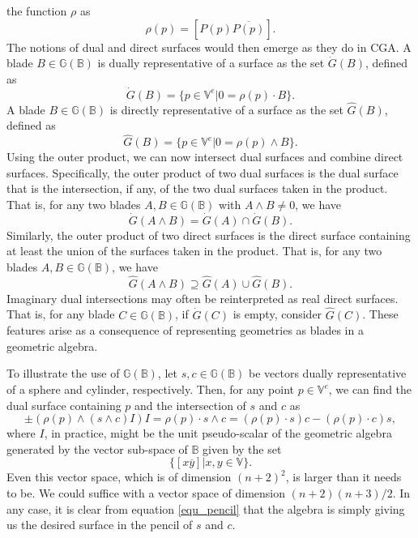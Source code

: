\documentclass{birkjour}
\theoremstyle{definition}
\theoremstyle{remark}
\numberwithin{equation}{section}
\newcommand{\G}{\mathbb{G}}
\newcommand{\V}{\mathbb{V}}
\newcommand{\B}{\mathbb{B}}
\newcommand{\Gi}{\dot{G}}
\newcommand{\Go}{\hat{G}}
\begin{document}
the function $\rho$ as
\begin{equation}\label{equ_def_of_rho}
\rho(p) = [P(p)\overline{P(p)}].
\end{equation}
The notions of dual and direct surfaces
would then emerge as they do in CGA.  A blade $B\in\G(\B)$ is dually representative
of a surface as the set $\Gi(B)$, defined as
\begin{equation}\label{equ_algebraic_set}
\Gi(B) = \{p\in\V^e|0=\rho(p)\cdot B\}.
\end{equation}
A blade $B\in\G(\B)$ is directly representative of a surface as the set $\Go(B)$,
defined as
\begin{equation}
\Go(B) = \{p\in\V^e|0=\rho(p)\wedge B\}.
\end{equation}
Using the outer product, we can now
intersect dual surfaces and combine direct surfaces.  Specifically, the outer product
of two dual surfaces is the dual surface that is the intersection, if any, of the two
dual surfaces taken in the product.  That is, for any two blades $A,B\in\G(\B)$
with $A\wedge B\neq 0$, we have
\begin{equation}
\Gi(A\wedge B)=\Gi(A)\cap\Gi(B).
\end{equation}
Similarly, the outer product
of two direct surfaces is the direct surface containing at least the union of the surfaces
taken in the product.  That is, for any two blades $A,B\in\G(\B)$, we have
\begin{equation}
\Go(A\wedge B)\supseteq\Go(A)\cup\Go(B).
\end{equation}
Imaginary dual intersections may often be reinterpreted as real direct surfaces.  That is,
for any blade $C\in\G(\B)$, if $\Gi(C)$ is empty, consider $\Go(C)$.
These features arise as a consequence of representing geometries
as blades in a geometric algebra.

To illustrate the use of $\G(\B)$, let $s,c\in\G(\B)$ be vectors dually representative
of a sphere and cylinder, respectively.  Then, for any point $p\in\V^e$, we can find
the dual surface containing $p$ and the intersection of $s$ and $c$ as
\begin{equation}\label{equ_pencil}
\pm (\rho(p)\wedge(s\wedge c)I)I = \rho(p)\cdot s\wedge c =
(\rho(p)\cdot s)c - (\rho(p)\cdot c)s,
\end{equation}
where $I$, in practice, might be the unit pseudo-scalar of the geometric algebra
generated by the vector sub-space of $\B$ given by the set
\begin{equation}
\{[x\overline{y}]|x,y\in\V\}.
\end{equation}
Even this vector space, which is of dimension $(n+2)^2$, is larger than it needs to be.
We could suffice with a vector space of dimension $(n+2)(n+3)/2$.
In any case, it is clear from equation \eqref{equ_pencil} that the algebra
is simply giving us the desired surface in the pencil of $s$ and $c$.
\end{document}
